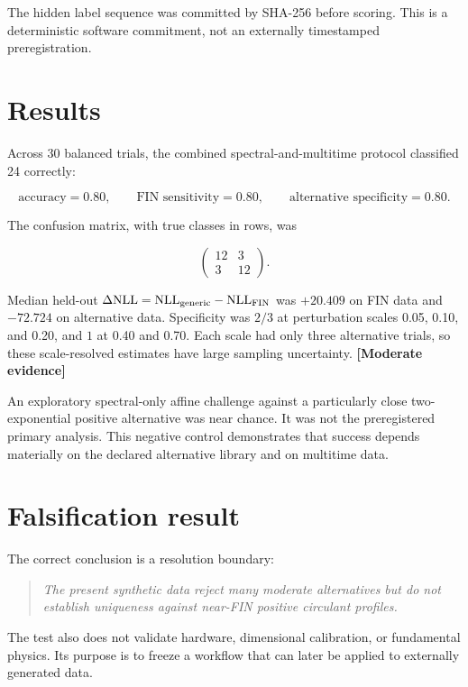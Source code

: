 \documentclass[11pt,a4paper,openany]{report}
\newcommand{\statusModerate}{\textcolor{finviolet}{[Moderate evidence]}}
\begin{document}
The hidden label sequence was committed by SHA-256 before scoring. This is a deterministic software commitment, not an externally timestamped preregistration.

\section{Results}

Across 30 balanced trials, the combined spectral-and-multitime protocol classified 24 correctly:

\[
\text{accuracy}=0.80,
\qquad
\text{FIN sensitivity}=0.80,
\qquad
\text{alternative specificity}=0.80.
\]

The confusion matrix, with true classes in rows, was

\[
\begin{pmatrix}
12&3\\
3&12
\end{pmatrix}.
\]

Median held-out \(\Delta\mathrm{NLL}=\mathrm{NLL}_{\rm generic}-\mathrm{NLL}_{\rm FIN}\) was \(+20.409\) on FIN data and \(-72.724\) on alternative data. Specificity was \(2/3\) at perturbation scales 0.05, 0.10, and 0.20, and \(1\) at 0.40 and 0.70. Each scale had only three alternative trials, so these scale-resolved estimates have large sampling uncertainty. \textbf{\statusModerate{}}

An exploratory spectral-only affine challenge against a particularly close two-exponential positive alternative was near chance. It was not the preregistered primary analysis. This negative control demonstrates that success depends materially on the declared alternative library and on multitime data.

\section{Falsification result}

The correct conclusion is a resolution boundary:

\begin{quote}\itshape
The present synthetic data reject many moderate alternatives but do not establish uniqueness against near-FIN positive circulant profiles.

\end{quote}

The test also does not validate hardware, dimensional calibration, or fundamental physics. Its purpose is to freeze a workflow that can later be applied to externally generated data.
\end{document}
